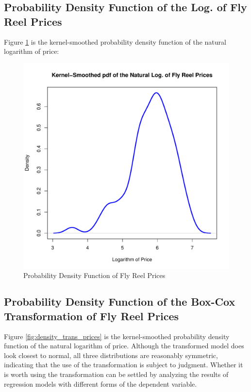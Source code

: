 \documentclass[11pt]{paper}
\begin{document}
\subsection{Probability Density Function of the Log. of Fly Reel Prices}

Figure \ref{fig:density_log_prices} is the kernel-smoothed probability density function of the natural logarithm of
price:

\begin{figure}[h!]
  \centering
  \includegraphics[scale = 0.5, keepaspectratio=true]{../Figures/density_log_prices}
  \caption{Probability Density Function of Fly Reel Prices} \label{fig:density_log_prices}
\end{figure}



\pagebreak
\subsection{Probability Density Function of the Box-Cox Transformation of Fly Reel Prices}

Figure \ref{fig:density_trans_prices} is the kernel-smoothed probability density function of the natural logarithm of
price. 
Although the transformed model does look closest to normal,
all three distributions are reasonably symmetric, 
indicating that the use of the transformation is subject to judgment.
Whether it is worth using the transformation
can be settled by analyzing the results of regression models 
with different forms of the dependent variable. 
\end{document}
